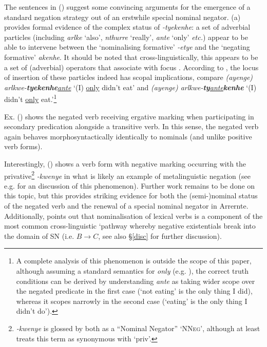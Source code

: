 \documentclass[usenames,dvipsnames,11pt]{article}
\begin{document}
{The sentences in (\lastx) suggest some convincing arguments for the emergence of a standard negation strategy out of an erstwhile special nominal negator. (a) provides formal evidence of the complex status of \textit{-tyekenhe}: a set of adverbial particles (including \textit{\textdblhyphen arlke} `also', \textit{\textdblhyphen nthurre} `really', \textit{\textdblhyphen ante} `only' \textit{etc.}) appear to be able to intervene between the `nominalising formative' \textit{-etye} and the `negating formative' \textit{\textdblhyphen akenhe}. It should be noted that cross-linguistically, this appears to be a set of (adverbial) operators that associate with focus \citep[e.g][]{Jackendoff1972,Rooth1985}. According to \citet[381]{Wilkins1989}, the locus of insertion of these particles indeed has scopal implications, compare \textit{(ayenge) arlkwe-\textbf{tyekenhe}\ul{\textdblhyphen ante}} `(I) \ul{only} didn't eat' and \textit{(ayenge) arlkwe-\textbf{ty}\ul{\guillemotleft ante\guillemotright}\textbf{kenhe}} `(I) didn't \ul{only} eat.'\footnote{A complete analysis of this phenomenon is outside the scope of this paper, although assuming a standard semantics for \textit{only} (e.g. \citealt{Horn1969}), the correct truth conditions can be derived by understanding \textit{\textdblhyphen ante} as taking wider scope over the negated predicate in the first case (`not eating' is the only thing I did), whereas it scopes narrowly in the second case (`eating' is the only thing I didn't do').}
 
Ex. () shows the negated verb receiving ergative marking when participating in secondary predication alongside a transitive verb. In this sense, the negated verb again behaves morphosyntactically identically to nominals (and unlike positive verb forms).

Interestingly, () shows a verb form with negative marking occurring with the privative\footnote{\textit{-kwenye} is glossed by both \citealt{Henderson2013,Wilkins1989} as a ``Nominal Negator'' `\textsc{NNeg}', although at least \citealt[158]{Wilkins1989} treats this term as synonymous with `\gls{priv}'.} \textit{-kwenye} in what is likely an example of metalinguistic negation (see e.g. \citealt[19]{Horn2017} for an discussion of this phenomenon). Further work remains to be done on this topic, but this provides striking evidence for both the (semi-)nominal status of the negated verb and the renewal of a special nominal negator in Arrernte. Additionally, \citet[171]{Veselinova2016} points out that nominalisation of lexical verbs is a component of the most common cross-linguistic `pathway whereby negative existentials break into the domain of SN (i.e. $B\to C$, see also §\ref{disc} for further discussion).


}
\end{document}
